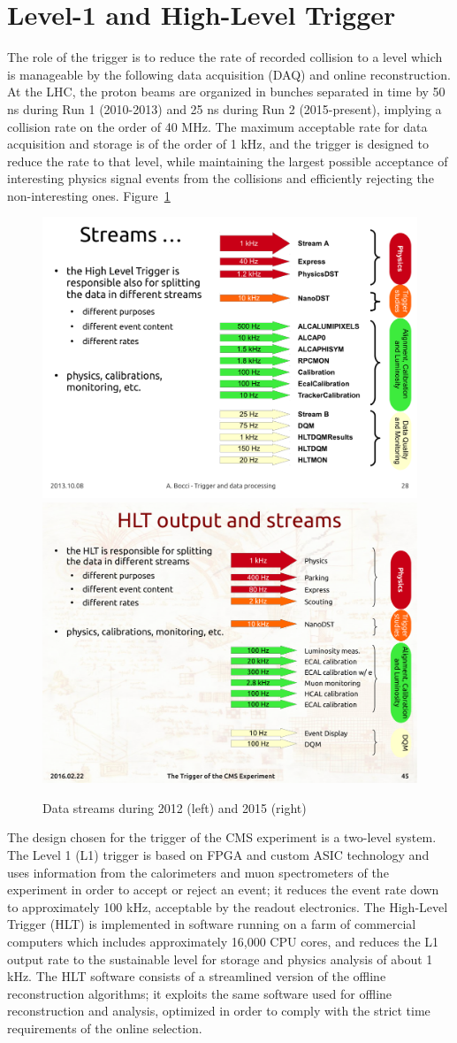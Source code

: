 \section {Level-1 and High-Level Trigger}
\label{sec:trigger}

The role of the trigger is to reduce the rate of recorded collision to
a level which is manageable by the following data acquisition (DAQ)
and online reconstruction. At the LHC, the proton beams are organized in
bunches separated in time by 50 \unit{ns} during Run 1 (2010-2013) and 25 \unit{ns}
during Run 2 (2015-present), implying a collision rate on the order of
40 \unit{MHz}.
The maximum acceptable rate for data acquisition and storage is of the order of 1 \unit{kHz}, and
the trigger is designed to reduce the rate to that level, while
maintaining the largest possible acceptance of interesting physics signal
events from the collisions and efficiently rejecting the
non-interesting ones. Figure~\ref{fig:streams}

\begin{figure}\centering
\includegraphics[width=.45\textwidth]{figs/cms/Streams2012.pdf}
\includegraphics[width=.45\textwidth]{figs/cms/Streams2015.pdf}
\caption{Data streams during 2012 (left) and 2015 (right)
\label{fig:streams}}
\end{figure}

The design chosen for the trigger of the CMS experiment is a two-level system. The
Level 1 (L1) trigger is based on FPGA and custom ASIC technology and uses information
from the calorimeters and muon spectrometers of the experiment in order to accept or reject
an event; it reduces the event rate down to approximately 100 \unit{kHz}, acceptable by the readout
electronics. The High-Level Trigger (HLT) is implemented in software running on a farm of
commercial computers which includes approximately 16,000 CPU cores, and reduces the L1 output rate
to the sustainable level for storage and physics analysis of about 1 \unit{kHz}. The HLT software
consists of a streamlined version of the offline reconstruction
algorithms; it exploits the same software used for offline
reconstruction and analysis, optimized in order to comply with the
strict time requirements of the online selection.

